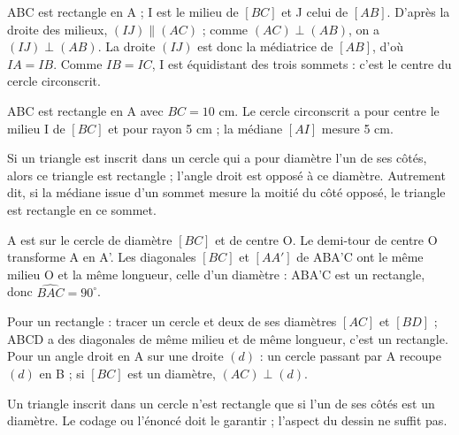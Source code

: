 \begin{demonstration}ABC est rectangle en A ; I est le milieu de $[BC]$ et J celui de $[AB]$. D’après la droite des milieux, $(IJ)\parallel(AC)$ ; comme $(AC)\perp(AB)$, on a $(IJ)\perp(AB)$. La droite $(IJ)$ est donc la médiatrice de $[AB]$, d’où $IA=IB$. Comme $IB=IC$, I est équidistant des trois sommets : c’est le centre du cercle circonscrit.\end{demonstration}
\begin{exemple}ABC est rectangle en A avec $BC=10$ cm. Le cercle circonscrit a pour centre le milieu I de $[BC]$ et pour rayon 5 cm ; la médiane $[AI]$ mesure 5 cm.\end{exemple}
\clearpage
{}\label{cours-16-2}
\begin{theoreme}[Réciproque]Si un triangle est inscrit dans un cercle qui a pour diamètre l’un de ses côtés, alors ce triangle est rectangle ; l’angle droit est opposé à ce diamètre. Autrement dit, si la médiane issue d’un sommet mesure la moitié du côté opposé, le triangle est rectangle en ce sommet.\end{theoreme}
\begin{demonstration}A est sur le cercle de diamètre $[BC]$ et de centre O. Le demi-tour de centre O transforme A en A’. Les diagonales $[BC]$ et $[AA']$ de ABA’C ont le même milieu O et la même longueur, celle d’un diamètre : ABA’C est un rectangle, donc $\widehat{BAC}=90^\circ$.\end{demonstration}
\begin{savoirfaire}Pour un rectangle : tracer un cercle et deux de ses diamètres $[AC]$ et $[BD]$ ; ABCD a des diagonales de même milieu et de même longueur, c’est un rectangle. Pour un angle droit en A sur une droite $(d)$ : un cercle passant par A recoupe $(d)$ en B ; si $[BC]$ est un diamètre, $(AC)\perp(d)$.\end{savoirfaire}
\begin{attention}Un triangle inscrit dans un cercle n’est rectangle que si l’un de ses côtés est un diamètre. Le codage ou l’énoncé doit le garantir ; l’aspect du dessin ne suffit pas.\end{attention}

